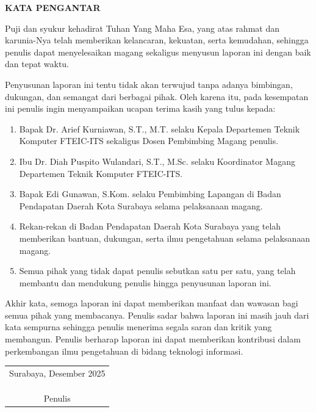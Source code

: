 \begin{center}
  \Large\textbf{KATA PENGANTAR}
\end{center}
\vspace{2ex}



Puji dan syukur kehadirat Tuhan Yang Maha Esa, yang atas rahmat dan karunia-Nya telah memberikan kelancaran, kekuatan, serta kemudahan, sehingga penulis dapat menyelesaikan magang sekaligus menyusun laporan ini dengan baik dan tepat waktu.

Penyusunan laporan ini tentu tidak akan terwujud tanpa adanya bimbingan, dukungan, dan semangat dari berbagai pihak. Oleh karena itu, pada kesempatan ini penulis ingin menyampaikan ucapan terima kasih yang tulus kepada:


\begin{enumerate}[nolistsep]

  \item Bapak Dr. Arief Kurniawan, S.T., M.T. selaku Kepala Departemen Teknik Komputer FTEIC-ITS sekaligus Dosen Pembimbing Magang penulis.

  \item Ibu Dr. Diah Puspito Wulandari, S.T., M.Sc. selaku Koordinator Magang Departemen Teknik Komputer FTEIC-ITS.

  \item Bapak Edi Gunawan, S.Kom. selaku Pembimbing Lapangan di Badan Pendapatan Daerah Kota Surabaya selama pelaksanaan magang.
  
  \item Rekan-rekan di Badan Pendapatan Daerah Kota Surabaya yang telah memberikan bantuan, dukungan, serta ilmu pengetahuan selama pelaksanaan magang.
  
  \item Semua pihak yang tidak dapat penulis sebutkan satu per satu, yang telah membantu dan mendukung penulis hingga penyusunan laporan ini.

\end{enumerate}

Akhir kata, semoga laporan ini dapat memberikan manfaat dan wawasan bagi semua pihak yang membacanya. Penulis sadar bahwa laporan ini masih jauh dari kata sempurna sehingga penulis menerima segala saran dan kritik yang membangun. Penulis berharap laporan ini dapat memberikan kontribusi dalam perkembangan ilmu pengetahuan di bidang teknologi informasi.

\begin{flushright}
  \begin{tabular}[b]{c}
    Surabaya, Desember 2025
    \\
    \\
    \\
    \\
    Penulis
  \end{tabular}
\end{flushright}
